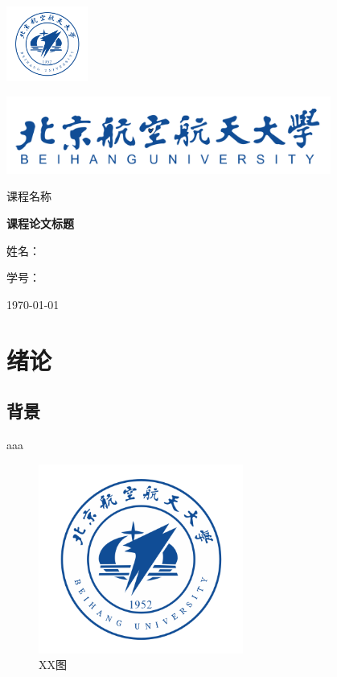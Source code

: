 \documentclass[12pt,a4paper]{article}
\begin{document}
\begin{titlepage}
	\centering
	\includegraphics[width=0.2\textwidth]{sf1.png}\par
	\vspace{1cm}
	\includegraphics[width=0.8\textwidth]{sf.png}\par
	\vspace{1cm}
	{\kaishu\LARGE 课程名称 \par}
	\vspace{2cm}
	{\Huge\bfseries 课程论文标题 \par}
	\vspace{3.5cm}
	{\Large 姓名： \par}
	{\Large 学号： \par}
	\vfill

	\vfill
	{\large \today\par}
\end{titlepage}

\tableofcontents

\newpage
\section{绪论}
\subsection{背景}
aaa\cite{ref1}

\begin{figure}[ht] %
	\centering
	\includegraphics[width=0.6\textwidth]{sf1.png}%
	\caption{XX图}%
	\label{figure1} %
\end{figure}
\end{document}

